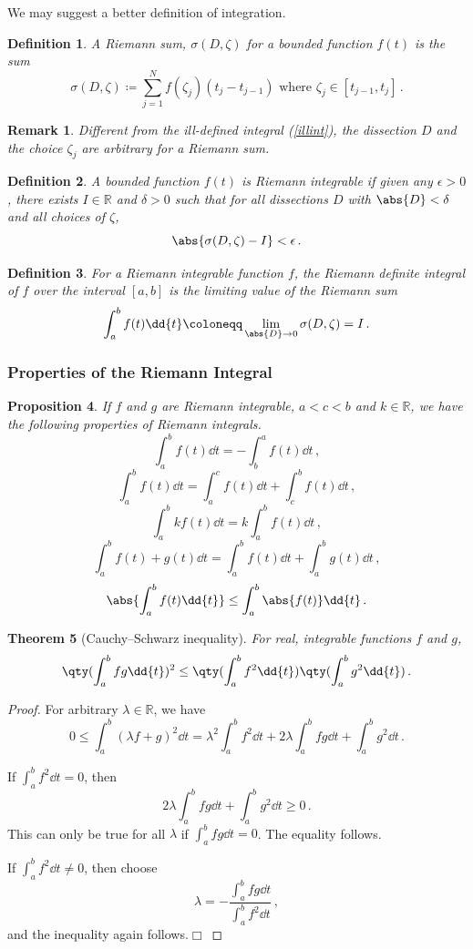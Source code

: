 \documentclass{article}
\theoremstyle{plain}\theoremheaderfont{\normalfont\itshape}\theorembodyfont{\rmfamily}\theoremseparator{.}\newtheorem*{rem}{Remark}\newtheorem*{ex}{Example}\newtheorem*{proof}{Proof}\newtheorem*{altp}{Alternative proof}
\theoremstyle{plain}\theoremheaderfont{\normalfont\bfseries}\theorembodyfont{\rmfamily}\theoremseparator{.}\newtheorem{thm}{Theorem}[section]\newtheorem{lem}[thm]{Lemma}\newtheorem{prop}[thm]{Proposition}\newtheorem*{cor}{Corollary}\newtheorem{defn}[thm]{Definition}\newtheorem{clm}[thm]{Claim}\newtheorem{clminproof}{Claim}
\theoremstyle{break}\theoremheaderfont{\normalfont\itshape}\theorembodyfont{\rmfamily}\theoremseparator{.\medskip}\newtheorem*{proofskip}{Proof}\newtheorem*{exs}{Examples}\newtheorem*{rems}{Remarks}
\theoremstyle{break}\theoremheaderfont{\normalfont\bfseries}\theorembodyfont{\rmfamily}\theoremseparator{.\medskip}\newtheorem{lemskip}[thm]{Lemma}\newtheorem{defnskip}[thm]{Definition}\newtheorem{propskip}[thm]{Proposition}\newtheorem{thmskip}[thm]{Theorem}
\numberwithin{equation}{section}
\newcommand{\qed}{\hfill\ensuremath{\Box}}
\begin{document}
	We may suggest a better definition of integration.

	\begin{defn}
		A \textit{Riemann sum}, \(\sigma(D,\zeta)\) for a bounded function \(f(t)\) is the sum
		\[\sigma(D,\zeta)\coloneqq \sum_{j=1}^{N}f(\zeta_j)(t_j-t_{j-1})\text{ where }\zeta_j\in [t_{j-1},t_j]\,.\]
	\end{defn}
	\begin{rem}
		Different from the ill-defined integral (\cref{illint}), the dissection \(D\) and the choice \(\zeta_j\) are arbitrary for a Riemann sum.
	\end{rem}
	\begin{defn}
		A bounded function \(f(t)\) is \textit{Riemann integrable} if given any \(\epsilon> 0\), there exists \(I\in\mathbb{R}\) and \(\delta>0\) such that for all dissections \(D\) with \(\abs{D}<\delta\) and all choices of \(\zeta\),
		\[\abs{\sigma(D,\zeta)-I}<\epsilon\,.\]
	\end{defn}
	\begin{defn}
		For a Riemann integrable function \(f\), the \textit{Riemann definite integral} of \(f\) over the interval \([a, b]\) is the limiting value of the Riemann sum
		\[\int_{a}^{b}f(t)\dd{t}\coloneqq\lim_{\abs{D}\to 0}\sigma(D,\zeta)=I\,.\]
	\end{defn}
	\subsubsection{Properties of the Riemann Integral}
	\begin{prop}
		If \(f\) and \(g\) are Riemann integrable, \(a<c<b\) and \(k\in\mathbb{R}\), we have the following properties of Riemann integrals.
		\[\int_{a}^{b}f(t)\dd{t}=-\int_{b}^{a}f(t)\dd{t}\,,\]
		\[\int_{a}^{b}f(t)\dd{t}=\int_{a}^{c}f(t)\dd{t}+\int_{c}^{b}f(t)\dd{t}\,,\]
		\[\int_{a}^{b}kf(t)\dd{t}=k\int_{a}^{b}f(t)\dd{t}\,,\]
		\[\int_{a}^{b}f(t)+g(t)\dd{t}=\int_{a}^{b}f(t)\dd{t}+\int_{a}^{b}g(t)\dd{t}\,,\]
		\[\abs{\int_{a}^{b}f(t)\dd{t}}\le\int_{a}^{b}\abs{f(t)}\dd{t}\,.\]
	\end{prop}
	\begin{thm}[Cauchy--Schwarz inequality]
		For real, integrable functions \(f\) and \(g\),
		\[\qty(\int_{a}^{b}fg\dd{t})^2\le\qty(\int_{a}^{b}f^2\dd{t})\qty(\int_{a}^{b}g^2\dd{t})\,.\]
	\end{thm}
	\begin{proof}
		For arbitrary \(\lambda\in\mathbb{R}\), we have
		\[0\le\int_{a}^{b}(\lambda f+g)^2\dd{t}=\lambda^2\int_{a}^{b}f^2\dd{t}+2\lambda\int_{a}^{b}fg\dd{t}+\int_{a}^{b}g^2\dd{t}\,.\]

		If \(\int_{a}^{b}f^2\dd{t}=0\), then
		\[2\lambda\int_{a}^{b}fg\dd{t}+\int_{a}^{b}g^2\dd{t}\ge 0\,.\]
		This can only be true for all \(\lambda\) if \(\int_{a}^{b}fg\dd{t}=0\). The equality follows.

		If \(\int_{a}^{b}f^2\dd{t}\ne 0\), then choose
		\[\lambda=-\frac{\displaystyle\int_{a}^{b}fg\dd{t}}{\displaystyle\int_{a}^{b}f^2\dd{t}}\,,\]
		and the inequality again follows.\qed
	\end{proof}
\end{document}

